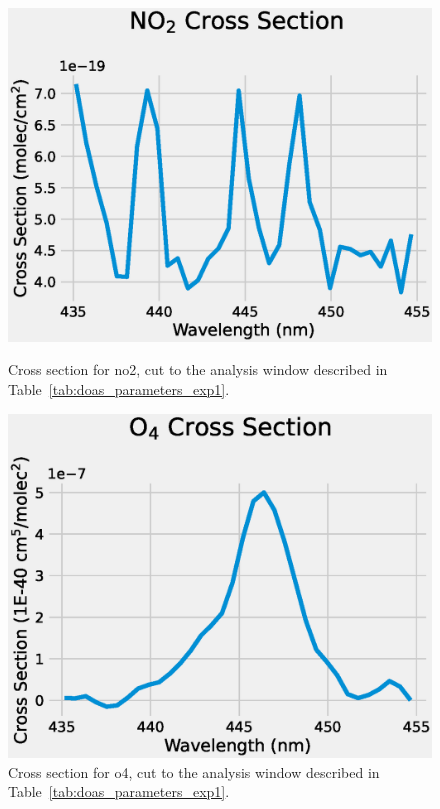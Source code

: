 \begin{figure}[htpb]
    \begin{minipage}{.45\textwidth}
        \centering
        \includegraphics[width=\textwidth]{img/eps/no2_cross_section.eps}
        \caption{Cross section for \gls{no2}, cut to the analysis window
        described in Table~\ref{tab:doas_parameters_exp1}.}
        \label{fig:no2_cross_section}
    \end{minipage}
    \hfill
    \begin{minipage}{.45\textwidth}
        \centering
        \includegraphics[width=\textwidth]{img/eps/o4_cross_section.eps}
        \caption{Cross section for \gls{o4}, cut to the analysis window
        described in Table~\ref{tab:doas_parameters_exp1}.}
        \label{fig:o4_cross_section}
    \end{minipage}
\end{figure}

